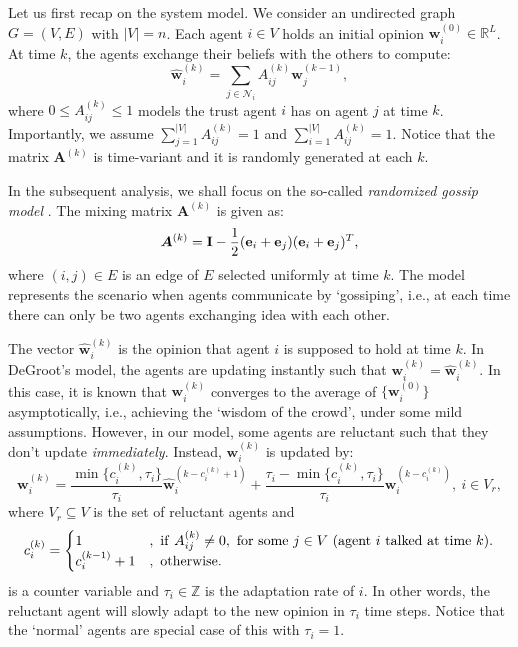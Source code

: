\documentclass[letter]{article}
\theoremstyle{remark}
\begin{document}
Let us first recap on the system model.
We consider an undirected graph $G = (V,E)$ with $|V| = n$. Each agent $i \in V$ holds an initial opinion ${\bm w}_i^{(0)} \in \mathbb{R}^L$. At time $k$, the agents exchange their beliefs with the others to compute:
\begin{equation}\label{eq:op}
\hat{\bm w}_i^{(k)} = \sum_{j \in \mathcal{N}_i} A_{ij}^{(k)} {\bm w}_j^{(k-1)},
\end{equation}
where $0 \leq A_{ij}^{(k)} \leq 1$ models the trust agent $i$ has on agent $j$ at time $k$. Importantly, we assume $\sum_{j=1}^{|V|} A_{ij}^{(k)} = 1$ and $\sum_{i=1}^{|V|} A_{ij}^{(k)} = 1$. Notice that the matrix ${\bm A}^{(k)}$ is time-variant and it is randomly generated at each $k$. 

In the subsequent analysis, we shall focus on the so-called \emph{randomized gossip model} \cite{}. The mixing matrix ${\bm A}^{(k)}$ is given as:
\[
{\bm A}^{(k)} = {\bf I} - \frac{1}{2} ({\bf e}_i + {\bf e}_j) ({\bf e}_i + {\bf e}_j)^T,
\]
where $(i,j) \in E$ is an edge of $E$ selected uniformly at time $k$. The model represents the scenario when agents communicate by `gossiping', i.e., at each time there can only be two agents exchanging idea with each other. 


The vector $\hat{\bm w}_i^{(k)}$ is the opinion that agent $i$ is supposed to hold at time $k$. In DeGroot's model, the agents are updating instantly such that ${\bm w}_i^{(k)} = \hat{\bm w}_i^{(k)} $. In this case, it is known that ${\bm w}_i^{(k)}$ converges to the average of $\{{\bm w}_i^{(0)} \}$ asymptotically, i.e., achieving the `wisdom of the crowd',  under some mild assumptions. 
However, in our model, some agents are reluctant such that they don't update \emph{immediately}. Instead, ${\bm w}_i^{(k)}$ is updated by:
\begin{equation} \label{eq:adapt}
{\bm w}_i^{(k)} = \frac{\min\{ c_i^{(k)}, \tau_i\} }{\tau_i} \hat{\bm w}_i^{(k - c_i^{(k)} + 1)} + \frac{\tau_i - \min\{ c_i^{(k)}, \tau_i\} }{\tau_i} {\bm w}_i^{(k-c_i^{(k)})},~i \in V_r,
\end{equation}
where $V_r \subseteq V$ is the set of reluctant agents and 
\[
c_i^{(k)} = \begin{cases}
1 &,~{\rm if}~A_{ij}^{(k)} \neq 0,~\text{for some}~j \in V~\text{(agent $i$ talked at time $k$)}. \\
c_i^{(k-1)} + 1 &,~{\rm otherwise}.
\end{cases}
\]
is a counter variable and $\tau_i \in \mathbb{Z}$ is the adaptation rate of $i$. In other words, the reluctant agent will slowly adapt to the new opinion in $\tau_i$ time steps. Notice that the `normal' agents are special case of this with $\tau_i = 1$. 
\end{document}
